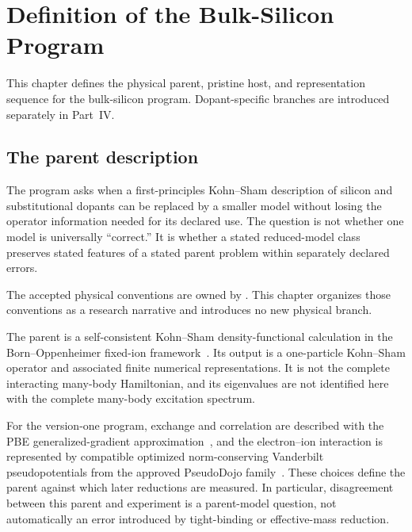 \chapter{Definition of the Bulk-Silicon Program}

\label{ch:physical-problem}


This chapter defines the physical parent, pristine host, and representation
sequence for the bulk-silicon program. Dopant-specific branches are introduced
separately in Part~IV.

\section{The parent description}


The program asks when a first-principles Kohn--Sham description of silicon and
substitutional dopants can be replaced by a smaller model without losing the
operator information needed for its declared use. The question is not whether
one model is universally ``correct.'' It is whether a stated reduced-model
class preserves stated features of a stated parent problem within separately
declared errors.

The accepted physical conventions are owned by
. This chapter
organizes those conventions as a research narrative and introduces no new
physical branch.

The parent is a self-consistent Kohn--Sham density-functional calculation in
the Born--Oppenheimer fixed-ion framework~\cite{hohenberg1964,kohn1965}. Its
output is a one-particle Kohn--Sham operator and associated finite numerical
representations. It is not the complete interacting many-body Hamiltonian, and
its eigenvalues are not identified here with the complete many-body excitation
spectrum.


For the version-one program, exchange and correlation are described with the
PBE generalized-gradient approximation~\cite{perdew1996}, and the
electron--ion interaction is represented by compatible optimized
norm-conserving Vanderbilt pseudopotentials from the approved PseudoDojo
family~\cite{hamann2013,vansetten2018}. These choices define the parent against
which later reductions are measured. In particular, disagreement between this
parent and experiment is a parent-model question, not automatically an error
introduced by tight-binding or effective-mass reduction.

